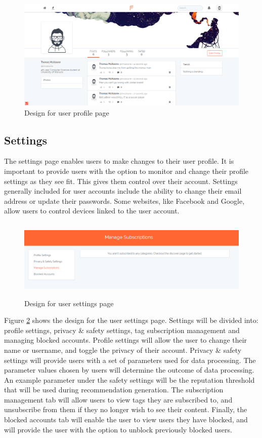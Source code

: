 \begin{figure}[H]
\centering
\includegraphics[width=\linewidth]{Images/Design/user_profile}
\caption{Design for user profile page}
\label{fig:user_profile}
\end{figure}

\subsection{Settings}
The settings page enables users to make changes to their user profile. It is important to provide users with the option to monitor and change their profile settings as they see fit. This gives them control over their account.  Settings generally included for user accounts include the ability to change their email address or update their passwords. Some websites, like Facebook and Google, allow users to control devices linked to the user account.

\begin{figure}[H]
\centering
\includegraphics[height=1.5in]{Images/Design/SettingsPage}
\caption{Design for user settings page}
\label{fig:SettingsPage}
\end{figure}

Figure \ref{fig:SettingsPage} shows the design for the user settings page. Settings will be divided into: profile settings, privacy \& safety settings, tag subscription management and managing blocked accounts. Profile settings will allow the user to change their name or username, and toggle the privacy of their account. Privacy \& safety settings will provide users with a set of parameters used for data processing. The parameter values chosen by users will determine the outcome of data processing. An example parameter under the safety settings will be the reputation threshold that will be used during recommendation generation. The subscription management tab will allow users to view tags they are subscribed to, and unsubscribe from them if they no longer wish to see their content. Finally, the blocked accounts tab will enable the user to view users they have blocked, and will provide the user with the option to unblock previously blocked users.

